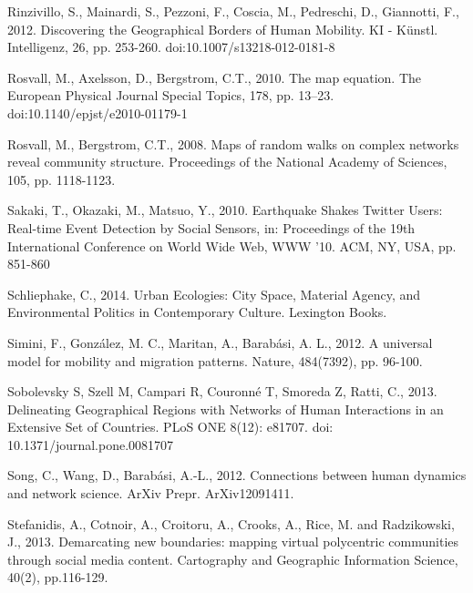 \documentclass[]{tGIS2e}
\begin{document}
\begin{thebibliography}{9}
Rinzivillo, S., Mainardi, S., Pezzoni, F., Coscia, M., Pedreschi, D., Giannotti, F., 2012. Discovering the Geographical Borders of Human Mobility. KI - Künstl. Intelligenz, 26, pp. 253-260. doi:10.1007/s13218-012-0181-8

Rosvall, M., Axelsson, D., Bergstrom, C.T., 2010. The map equation. The European Physical Journal Special Topics, 178, pp. 13–23. doi:10.1140/epjst/e2010-01179-1

Rosvall, M., Bergstrom, C.T., 2008. Maps of random walks on complex networks reveal community structure. Proceedings of the National Academy of Sciences, 105, pp. 1118-1123.

Sakaki, T., Okazaki, M., Matsuo, Y., 2010. Earthquake Shakes Twitter Users: Real-time Event Detection by Social Sensors, in: Proceedings of the 19th International Conference on World Wide Web, WWW ’10. ACM, NY, USA, pp. 851-860

Schliephake, C., 2014. Urban Ecologies: City Space, Material Agency, and Environmental Politics in Contemporary Culture. Lexington Books.

Simini, F., González, M. C., Maritan, A., Barabási, A. L., 2012. A universal model for mobility and migration patterns. Nature, 484(7392), pp. 96-100.

Sobolevsky S, Szell M, Campari R, Couronné T, Smoreda Z, Ratti, C., 2013. Delineating Geographical Regions with Networks of Human Interactions in an Extensive Set of Countries. PLoS ONE 8(12): e81707. doi: 10.1371/journal.pone.0081707

Song, C., Wang, D., Barabási, A.-L., 2012. Connections between human dynamics and network science. ArXiv Prepr. ArXiv12091411.

Stefanidis, A., Cotnoir, A., Croitoru, A., Crooks, A., Rice, M. and Radzikowski, J., 2013. Demarcating new boundaries: mapping virtual polycentric communities through social media content. Cartography and Geographic Information Science, 40(2), pp.116-129.


\end{thebibliography}
\end{document}
